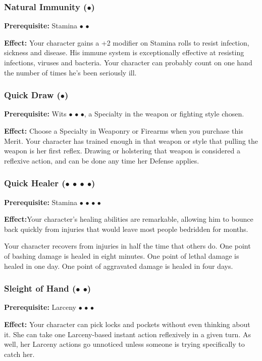 \documentclass["../Misguided by Starlight.tex"]{subfiles}
\begin{document}
	\subsubsection{Natural Immunity ($\bullet$)} %
		\textbf{Prerequisite:} Stamina $\bullet$ $\bullet$
		
		\textbf{Effect:} Your character gains a +2 modifier on Stamina rolls to resist infection, sickness and disease. His immune system is exceptionally effective at resisting infections, viruses and bacteria. Your character can probably count on one hand the number of times he’s been seriously ill.
	
	\subsubsection{Quick Draw ($\bullet$)} %
		\textbf{Prerequisite:} Wits $\bullet$ $\bullet$ $\bullet$, a Specialty in the weapon or fighting style chosen.
		
		\textbf{Effect:} Choose a Specialty in Weaponry or Firearms when you purchase this Merit. Your character has trained enough in that weapon or style that pulling the weapon is her first reflex. Drawing or holstering that weapon is considered a reflexive action, and can be done any time her Defense applies.
	
	\subsubsection{Quick Healer ($\bullet$ $\bullet$ $\bullet$ $\bullet$)} %
		\textbf{Prerequisite:} Stamina $\bullet$ $\bullet$ $\bullet$ $\bullet$
		
		\textbf{Effect:}Your character’s healing abilities are remarkable, allowing him to bounce back quickly from injuries that would leave most people bedridden for months. 
		
		Your character recovers from injuries in half the time that others do. One point of bashing damage is healed in eight minutes. One point of lethal damage is healed in one day. One point of aggravated damage is healed in four days.
	
	\subsubsection{Sleight of Hand ($\bullet$ $\bullet$)} %
		\textbf{Prerequisite:} Larceny $\bullet$ $\bullet$ $\bullet$
		
		\textbf{Effect:} Your character can pick locks and pockets without even thinking about it. She can take one Larceny-based instant action reflexively in a given turn. As well, her Larceny actions go unnoticed unless someone is trying specifically to catch her.
	
\end{document}
